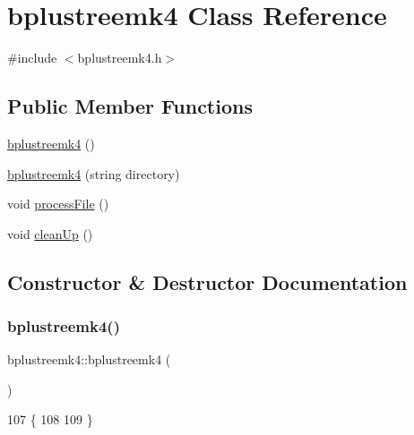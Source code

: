 \hypertarget{classbplustreemk4}{}\section{bplustreemk4 Class Reference}
\label{classbplustreemk4}


{\ttfamily \#include $<$bplustreemk4.\+h$>$}

\subsection*{Public Member Functions}
\begin{DoxyCompactItemize}
\item 
\mbox{\hyperlink{classbplustreemk4_a9cc051922ecb92f12f89563a63eba9c7}{bplustreemk4}} ()
\item 
\mbox{\hyperlink{classbplustreemk4_a1d4aac3f0517a54d9e838d7389203af5}{bplustreemk4}} (string directory)
\item 
void \mbox{\hyperlink{classbplustreemk4_abeaaa5003e7a3e2b0e99619ad718e14d}{process\+File}} ()
\item 
void \mbox{\hyperlink{classbplustreemk4_a6bca01d3bcc5461d899975b18c3d4c86}{clean\+Up}} ()
\end{DoxyCompactItemize}


\subsection{Constructor \& Destructor Documentation}
\mbox{\label{classbplustreemk4_a9cc051922ecb92f12f89563a63eba9c7}} 
\subsubsection{\texorpdfstring{bplustreemk4()}{bplustreemk4()}\hspace{0.1cm}{\footnotesize\ttfamily [1/2]}}
{\footnotesize\ttfamily bplustreemk4\+::bplustreemk4 (\begin{DoxyParamCaption}{ }\end{DoxyParamCaption})}


\begin{DoxyCode}
107                            \{
108 
109 \}
\end{DoxyCode}
\mbox{\label{classbplustreemk4_a1d4aac3f0517a54d9e838d7389203af5}} 
